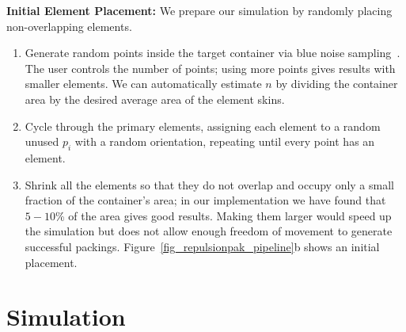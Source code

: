 \textbf{Initial Element Placement:}
We prepare our simulation by randomly placing non-overlapping elements.
\begin{enumerate}
	\item Generate random points 
		  inside the target container 
	      via blue noise sampling~\cite{Bridson2007}.
	      The user controls the number of points; using more points gives results
	      with smaller elements.  We can automatically estimate $n$ by
		  dividing the container area by the desired average area of the element skins.
	\item Cycle through the primary elements, assigning each element to a 
		  random unused $p_i$ with a random orientation, repeating until 
		  every point has an element.
	\item Shrink all the elements so that they do not overlap and occupy only
		  a small fraction of the container's area; in our implementation we
		  have found that $5-10$\% of the area gives good results. Making them
		  larger would speed up the simulation but does
	      not allow enough freedom of movement to generate successful
		  packings.  Figure~\ref{fig_repulsionpak_pipeline}b shows an initial placement.	      
\end{enumerate}


\section{Simulation}
\label{repulsionpak_simulation}


